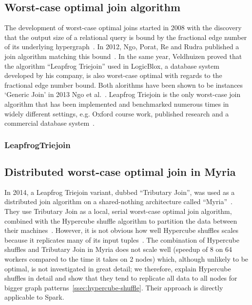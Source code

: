 \subsection{Worst-case optimal join algorithm}
The development of worst-case optimal joins started in 2008 with the discovery that the output size of a relational query is bound by the fractional edge number of its underlying hypergraph~\cite{agm}.
In 2012, Ngo, Porat, Re and Rudra published a join algorithm matching this bound~\cite{nprr}.
In the same year, Veldhuizen proved that the algorithm ``Leapfrog Triejoin'' used in LogicBlox, a database system developed by his company, is also worst-case optimal with regards to the
fractional edge number bound.
Both alorithms have been shown to be instances `Generic Join' in 2013 Ngo et al.~\cite{skew-strikes-back}.
Leapfrog Triejoin is the only worst-case join algorithm that has been implemented and benchmarked numerous times in widely different settings, e.g. Oxford course work, published research and a commercial database system~\cite{leapfrog,andreas,olddog,myria,ammar2018distributed,leapfrog-triejoin-schroeder}.

\subsubsection{LeapfrogTriejoin}

\subsection{Distributed worst-case optimal join in Myria}
In 2014, a Leapfrog Triejoin variant, dubbed ``Tributary Join'', was used as a distributed join algorithm on a shared-nothing architecture called ``Myria''~\cite{myria-detailed}.
They use Tributary Join as a local, serial worst-case optimal join algorithm, combined with the Hypercube shuffle algorithm to partition the data between their machines~\cite{hypercube}.
However, it is not obvious how well Hypercube shuffles scales because it replicates many of its input tuples~\cite{myria-detailed}.
The combination of Hypercube shuffles and Tributary Join in Myria does not scale well (speedup of 8 on 64 workers compared to the time it takes on 2 nodes) which, although unlikely to be optimal, is not investigated in great detail; we therefore, explain Hypercube shuffles in detail and show that they tend to replicate all data to all nodes for bigger graph patterns~\cref{ssec:hypercube-shuffle}.
Their approach is directly applicable to Spark.

